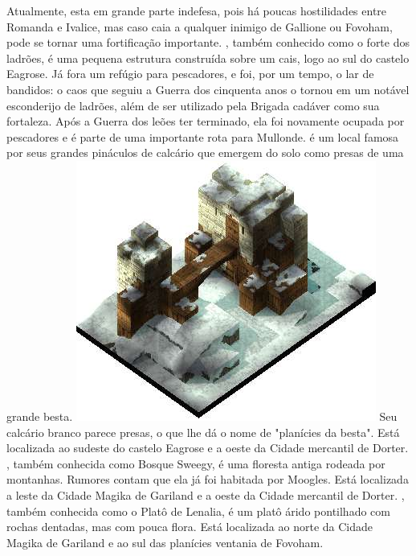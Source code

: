 Atualmente, esta em grande parte indefesa, pois há poucas hostilidades entre Romanda e Ivalice, mas caso caia a qualquer inimigo de Gallione ou Fovoham, pode se tornar uma fortificação importante.
, também conhecido como o forte dos ladrões, é uma pequena estrutura construída sobre um cais, logo ao sul do castelo Eagrose.
Já fora um refúgio para pescadores, e foi, por um tempo, o lar de bandidos: o caos que seguiu a Guerra dos cinquenta anos o tornou em um notável esconderijo de ladrões, além de ser utilizado pela Brigada cadáver como sua fortaleza.
Após a Guerra dos leões ter terminado, ela foi novamente ocupada por pescadores e é parte de uma importante rota para Mullonde.
 é um local famosa por seus grandes pináculos de calcário que emergem do solo como presas de uma grande besta.
%
\vfill
\includegraphics[width=\columnwidth]{./art/worldbook/zeakden.jpg}
\newpage
%
Seu calcário branco parece presas, o que lhe dá o nome de "planícies da besta". Está localizada ao sudeste do castelo Eagrose e a oeste da Cidade mercantil de Dorter.
, também conhecida como Bosque Sweegy, é uma floresta antiga rodeada por montanhas.
Rumores contam que ela já foi habitada por Moogles.
Está localizada a leste da Cidade Magika de Gariland e a oeste da Cidade mercantil de Dorter.
, também conhecida como o Platô de Lenalia, é um platô árido pontilhado com rochas dentadas, mas com pouca flora.
Está localizada ao norte da Cidade Magika de Gariland e ao sul das planícies ventania de Fovoham.
